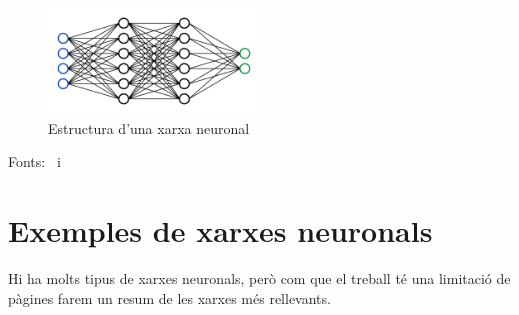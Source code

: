 \begin{figure}[h!]
    \centering
    \includegraphics[width=0.5\textwidth]{./figures/xarxa.png}
    \caption{Estructura d'una xarxa neuronal}
\end{figure}

Fonts:~\cite{Hidden_layer} i~\cite{linkedin}

\section{Exemples de xarxes neuronals}
Hi ha molts tipus de xarxes neuronals, però com que el treball té una limitació de pàgines farem un resum de les xarxes més rellevants.

